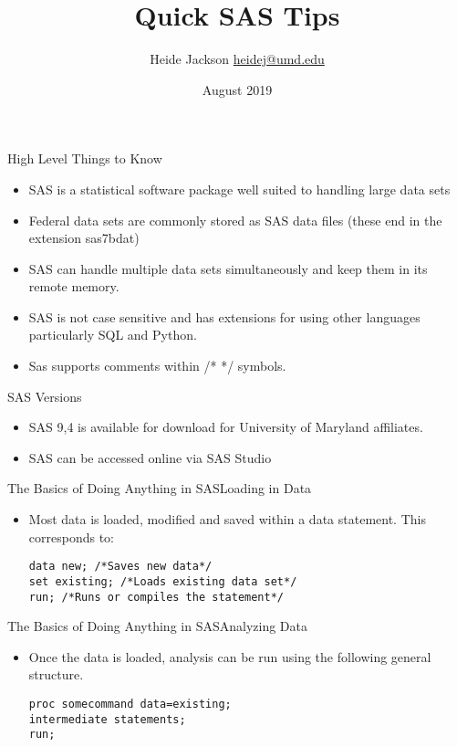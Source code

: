 \documentclass{beamer}
\title{Quick SAS Tips}
\author{\texorpdfstring{Heide Jackson \newline\url{heidej@umd.edu}}{Author}}
\institute{University of Maryland Population Research Center}
\date{August 2019}
\begin{document}
\maketitle
\begin{frame}{High Level Things to Know}
\begin{itemize}
\item SAS is a statistical software package well suited to handling large data sets
\item Federal data sets are commonly stored as SAS data files (these end in the extension sas7bdat)
\item SAS can handle multiple data sets simultaneously and keep them in its remote memory.
\item SAS is not case sensitive and has extensions for using other languages particularly SQL and Python.
\item Sas supports comments within /* */ symbols.
\end{itemize}
\end{frame}


\begin{frame}{SAS Versions}
\begin{itemize}
\item SAS 9,4 is available for download for University of Maryland affiliates.
\item SAS can be accessed online via SAS Studio
\end{itemize}
\end{frame}

\begin{frame}[fragile]{The Basics of Doing Anything in SAS}{Loading in Data}
\begin{itemize}
\item Most data is loaded, modified and saved within a data statement.  This corresponds to: 
\begin{verbatim}
data new; /*Saves new data*/
set existing; /*Loads existing data set*/
run; /*Runs or compiles the statement*/
\end{verbatim}
\end{itemize}
\end{frame}


\begin{frame}[fragile]{The Basics of Doing Anything in SAS}{Analyzing Data}
\begin{itemize}
\item Once the data is loaded, analysis can be run using the following general structure.
\begin{verbatim}
proc somecommand data=existing;
intermediate statements;
run;
\end{verbatim}
\end{itemize}
\end{frame}
\end{document}
